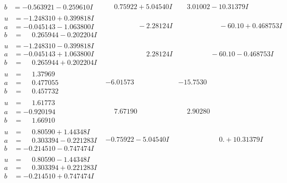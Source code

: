 \documentclass[1p]{elsarticle_modified}
\theoremstyle{definition}
\begin{document}
$$\begin{array}{c|c|c}
\begin{aligned}
b &= -0.563921 - 0.259610 I\end{aligned}
 & \phantom{-}0.75922 + 5.04540 I & \phantom{-}3.01002 - 10.31379 I \\ \hline\begin{aligned}
u &= -1.248310 + 0.399818 I \\
a &= -0.045143 - 1.063800 I \\
b &= \phantom{-}0.265944 - 0.202204 I\end{aligned}
 & \phantom{-0.000000 } -2.28124 I & \phantom{-0.000000 -}     -6
0. 10   + 0.468753 I \\ \hline\begin{aligned}
u &= -1.248310 - 0.399818 I \\
a &= -0.045143 + 1.063800 I \\
b &= \phantom{-}0.265944 + 0.202204 I\end{aligned}
 & \phantom{-0.000000 -}2.28124 I & \phantom{-0.000000 }      -6
0. 10   - 0.468753 I \\ \hline\begin{aligned}
u &= \phantom{-}1.37969\phantom{ +0.000000I} \\
a &= \phantom{-}0.477055\phantom{ +0.000000I} \\
b &= \phantom{-}0.457732\phantom{ +0.000000I}\end{aligned}
 & -6.01573\phantom{ +0.000000I} & -15.7530\phantom{ +0.000000I} \\ \hline\begin{aligned}
u &= \phantom{-}1.61773\phantom{ +0.000000I} \\
a &= -0.920194\phantom{ +0.000000I} \\
b &= \phantom{-}1.66910\phantom{ +0.000000I}\end{aligned}
 & \phantom{-}7.67190\phantom{ +0.000000I} & \phantom{-}2.90280\phantom{ +0.000000I} \\ \hline\begin{aligned}
u &= \phantom{-}0.80590 + 1.44348 I \\
a &= \phantom{-}0.303394 - 0.221283 I \\
b &= -0.214510 - 0.747474 I\end{aligned}
 & -0.75922 - 5.04540 I & \phantom{-0.000000 -}0. + 10.31379 I \\ \hline\begin{aligned}
u &= \phantom{-}0.80590 - 1.44348 I \\
a &= \phantom{-}0.303394 + 0.221283 I \\
b &= -0.214510 + 0.747474 I\end{aligned}

\end{array}$$
\end{document}
